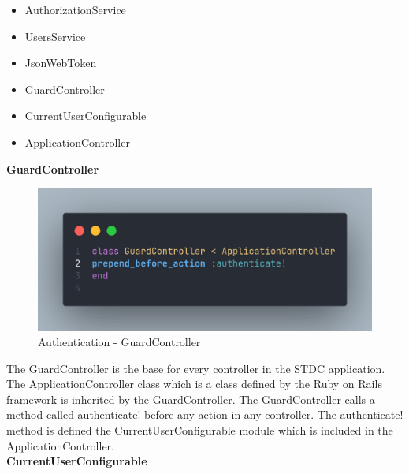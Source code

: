 \begin{justify}
\begin{itemize}
            \begin{itemize}
                \item AuthorizationService
                \item UsersService
                \item JsonWebToken
                \item GuardController
                \item CurrentUserConfigurable
                \item ApplicationController\\
            \end{itemize}
        \end{itemize}


        \vspace{0.25cm}
        \noindent\textbf{GuardController}
        
        \begin{figure}[H]
            \centerline{\includegraphics[width=150mm,scale=1]{figures/implementation_and_testing/implementation/backend/GuardController.png}}
            \caption{Authentication - GuardController}
        \end{figure}

        \newendline The GuardController is the base for every controller in the STDC application. The ApplicationController class which is a class defined by the Ruby on Rails framework is inherited by the GuardController. The GuardController calls a method called authenticate! before any action in any controller. The authenticate! method is defined the CurrentUserConfigurable module which is included in the ApplicationController.\\


        \clearpage
        \noindent\textbf{CurrentUserConfigurable}
        

\end{justify}
